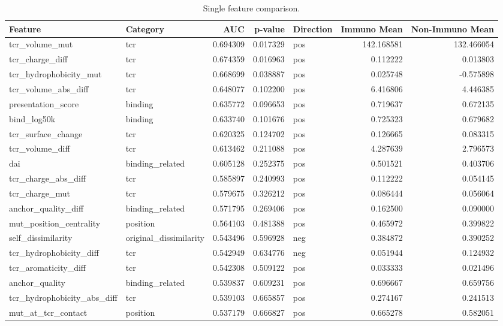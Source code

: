 \begin{table}
\caption{Single feature comparison.}
\label{tab:features}
\begin{tabular}{llrrlrr}
\toprule
Feature & Category & AUC & p-value & Direction & Immuno Mean & Non-Immuno Mean \\
\midrule
tcr\_volume\_mut & tcr & 0.694309 & 0.017329 & pos & 142.168581 & 132.466054 \\
tcr\_charge\_diff & tcr & 0.674359 & 0.016963 & pos & 0.112222 & 0.013803 \\
tcr\_hydrophobicity\_mut & tcr & 0.668699 & 0.038887 & pos & 0.025748 & -0.575898 \\
tcr\_volume\_abs\_diff & tcr & 0.648077 & 0.102200 & pos & 6.416806 & 4.446385 \\
presentation\_score & binding & 0.635772 & 0.096653 & pos & 0.719637 & 0.672135 \\
bind\_log50k & binding & 0.633740 & 0.101676 & pos & 0.725323 & 0.679682 \\
tcr\_surface\_change & tcr & 0.620325 & 0.124702 & pos & 0.126665 & 0.083315 \\
tcr\_volume\_diff & tcr & 0.613462 & 0.211088 & pos & 4.287639 & 2.796573 \\
dai & binding\_related & 0.605128 & 0.252375 & pos & 0.501521 & 0.403706 \\
tcr\_charge\_abs\_diff & tcr & 0.585897 & 0.240993 & pos & 0.112222 & 0.054145 \\
tcr\_charge\_mut & tcr & 0.579675 & 0.326212 & pos & 0.086444 & 0.056064 \\
anchor\_quality\_diff & binding\_related & 0.571795 & 0.269406 & pos & 0.162500 & 0.090000 \\
mut\_position\_centrality & position & 0.564103 & 0.481388 & pos & 0.465972 & 0.399822 \\
self\_dissimilarity & original\_dissimilarity & 0.543496 & 0.596928 & neg & 0.384872 & 0.390252 \\
tcr\_hydrophobicity\_diff & tcr & 0.542949 & 0.634776 & neg & 0.051944 & 0.124932 \\
tcr\_aromaticity\_diff & tcr & 0.542308 & 0.509122 & pos & 0.033333 & 0.021496 \\
anchor\_quality & binding\_related & 0.539837 & 0.609231 & pos & 0.696667 & 0.659756 \\
tcr\_hydrophobicity\_abs\_diff & tcr & 0.539103 & 0.665857 & pos & 0.274167 & 0.241513 \\
mut\_at\_tcr\_contact & position & 0.537179 & 0.666827 & pos & 0.665278 & 0.582051 \\

\end{tabular}
\end{table}

